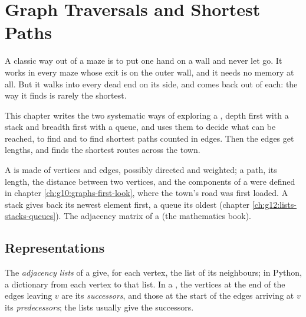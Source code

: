 \chapter{Graph Traversals and Shortest Paths}\label{ch:g12:graph-algorithms}

A classic way out of a maze is to put one hand on a wall and never let go. It works in every maze whose exit is on the
outer wall, and it needs no memory at all. But it walks into every dead end on its side, and comes back out of each:
the way it finds is rarely the shortest.

This chapter writes the two systematic ways of exploring a , depth first with a stack and breadth first with a
queue, and uses them to decide what can be reached, to find  and to find shortest paths counted in edges. Then
the edges get lengths, and  finds the shortest routes across the town.

\begin{recall}
A  is made of vertices and edges, possibly directed and weighted; a path, its length, the distance between two
vertices, and the components of a  were defined in chapter \ref{ch:g10:graphs-first-look}, where the town's road
 was first loaded. A stack gives back its newest element first, a queue its oldest (chapter
\ref{ch:g12:lists-stacks-queues}). The adjacency matrix of a  (the mathematics book).
\end{recall}

\section{Representations}\label{sec:g12:graph-algorithms:representations}

\begin{definition}\label{def:g12:graph-algorithms:adjacency-list}
The \emph{adjacency lists} of a  give, for each vertex, the list of its neighbours; in
Python, a dictionary from each vertex to that list. In a , the vertices at the end of the edges leaving
$v$ are its \emph{successors}, and those at the start of the edges arriving at $v$ its
\emph{predecessors}; the lists usually give the successors.
\end{definition}

